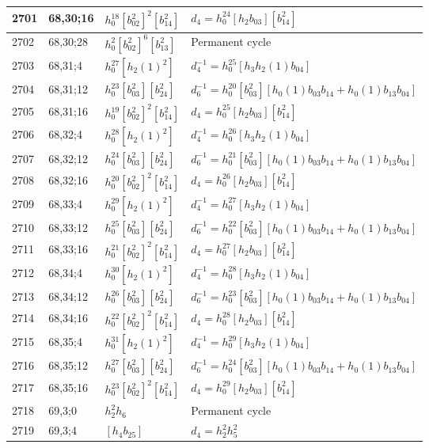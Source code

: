 \documentclass{article}
\begin{document}
\begin{longtable}{|l|l|>{\raggedright\arraybackslash}p{6cm}|>{\raggedright\arraybackslash}p{6cm}|}
\hline
2701 & 68,30;16 & $h_0^{18}[b_{02}^2]^2[b_{14}^2]$ &$d_{4}=h_0^{24}[h_2b_{03}][b_{14}^2]$\\
\hline
2702 & 68,30;28 & $h_0^2[b_{02}^2]^6[b_{13}^2]$ & Permanent cycle\\
\hline
2703 & 68,31;4 & $h_0^{27}[h_2(1)^2]$ & $d_{4}^{-1}=h_0^{25}[h_3h_2(1)b_{04}]$\\
\hline
2704 & 68,31;12 & $h_0^{23}[b_{03}^2][b_{24}^2]$ & $d_{6}^{-1}=h_0^{20}[b_{03}^2][h_0(1)b_{03}b_{14} + h_0(1)b_{13}b_{04}]$\\
\hline
2705 & 68,31;16 & $h_0^{19}[b_{02}^2]^2[b_{14}^2]$ &$d_{4}=h_0^{25}[h_2b_{03}][b_{14}^2]$\\
\hline
2706 & 68,32;4 & $h_0^{28}[h_2(1)^2]$ & $d_{4}^{-1}=h_0^{26}[h_3h_2(1)b_{04}]$\\
\hline
2707 & 68,32;12 & $h_0^{24}[b_{03}^2][b_{24}^2]$ & $d_{6}^{-1}=h_0^{21}[b_{03}^2][h_0(1)b_{03}b_{14} + h_0(1)b_{13}b_{04}]$\\
\hline
2708 & 68,32;16 & $h_0^{20}[b_{02}^2]^2[b_{14}^2]$ &$d_{4}=h_0^{26}[h_2b_{03}][b_{14}^2]$\\
\hline
2709 & 68,33;4 & $h_0^{29}[h_2(1)^2]$ & $d_{4}^{-1}=h_0^{27}[h_3h_2(1)b_{04}]$\\
\hline
2710 & 68,33;12 & $h_0^{25}[b_{03}^2][b_{24}^2]$ & $d_{6}^{-1}=h_0^{22}[b_{03}^2][h_0(1)b_{03}b_{14} + h_0(1)b_{13}b_{04}]$\\
\hline
2711 & 68,33;16 & $h_0^{21}[b_{02}^2]^2[b_{14}^2]$ &$d_{4}=h_0^{27}[h_2b_{03}][b_{14}^2]$\\
\hline
2712 & 68,34;4 & $h_0^{30}[h_2(1)^2]$ & $d_{4}^{-1}=h_0^{28}[h_3h_2(1)b_{04}]$\\
\hline
2713 & 68,34;12 & $h_0^{26}[b_{03}^2][b_{24}^2]$ & $d_{6}^{-1}=h_0^{23}[b_{03}^2][h_0(1)b_{03}b_{14} + h_0(1)b_{13}b_{04}]$\\
\hline
2714 & 68,34;16 & $h_0^{22}[b_{02}^2]^2[b_{14}^2]$ &$d_{4}=h_0^{28}[h_2b_{03}][b_{14}^2]$\\
\hline
2715 & 68,35;4 & $h_0^{31}[h_2(1)^2]$ & $d_{4}^{-1}=h_0^{29}[h_3h_2(1)b_{04}]$\\
\hline
2716 & 68,35;12 & $h_0^{27}[b_{03}^2][b_{24}^2]$ & $d_{6}^{-1}=h_0^{24}[b_{03}^2][h_0(1)b_{03}b_{14} + h_0(1)b_{13}b_{04}]$\\
\hline
2717 & 68,35;16 & $h_0^{23}[b_{02}^2]^2[b_{14}^2]$ &$d_{4}=h_0^{29}[h_2b_{03}][b_{14}^2]$\\
\hline
2718 & 69,3;0 & $h_2^2h_6$ & Permanent cycle\\
\hline
2719 & 69,3;4 & $[h_4b_{25}]$ &$d_{4}=h_2^2h_5^2$\\

\end{longtable}
\end{document}
